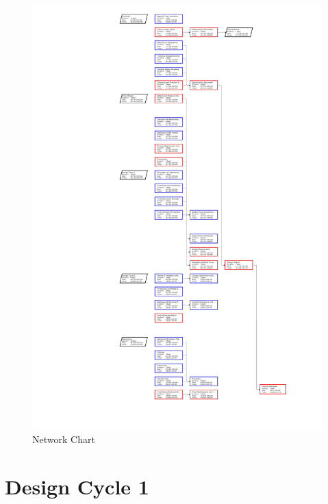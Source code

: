 \documentclass[12pt,a4paper]{article}
\begin{document}
\newpage

\begin{figure}[H]
    \centering
    \includegraphics[width=1.2\textwidth]{network.png} %
    \caption{Network Chart}
    
    \label{fig:GANTT CHART}
\end{figure}



\clearpage
\section{Design Cycle 1}
\end{document}
